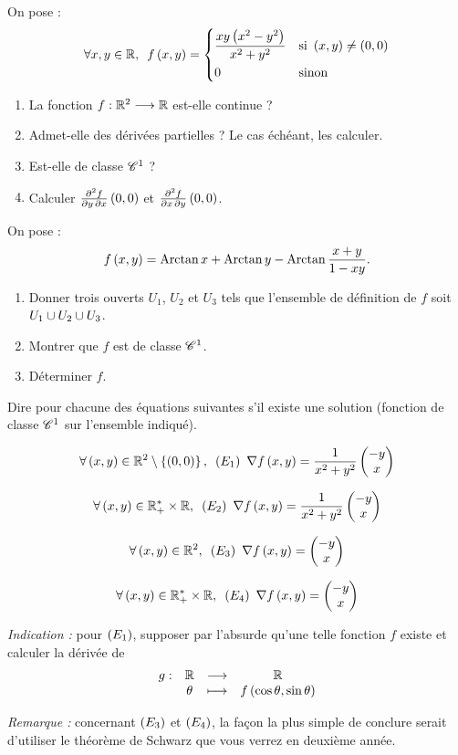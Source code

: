 \begin{exo}
On pose : \[\quantifs{\forall x,y\in\R}f\paren{x,y}=\begin{dcases}
\dfrac{xy\paren{x^2-y^2}}{x^2+y^2} &\text{si }\paren{x,y}\not=\paren{0,0} \\
0 &\text{sinon}
\end{dcases}\]

\begin{enumerate}
    \item La fonction \(f:\mathbb{R}^2\longrightarrow\mathbb{R}\) est-elle continue ? \\
    \item Admet-elle des dérivées partielles ? Le cas échéant, les calculer. \\
    \item Est-elle de classe \(\mathscr{C}^{1}\) ? \\
    \item Calculer \(\pdv{f}{y,x}\left(0,0\right)\) et \(\pdv{f}{x,y}\left(0,0\right)\).
\end{enumerate}
\end{exo}

\begin{exo}[Exercice 5]
On pose : \[f\left(x,y\right)=\operatorname{Arctan} x+\operatorname{Arctan} y-\operatorname{Arctan}\dfrac{x+y}{1-xy}.\]

\begin{enumerate}
    \item Donner trois ouverts  \(U_1\), \(U_2\) et \(U_3\) tels que l'ensemble de définition de \(f\) soit \(U_1\cup U_2\cup U_3\). \\
    \item Montrer que \(f\) est de classe \(\mathscr{C}^{1}\). \\
    \item Déterminer \(f\).
\end{enumerate}
\end{exo}

\begin{exo}[Exercice 6]
Dire pour chacune des équations suivantes s'il existe une solution (fonction de classe \(\mathscr{C}^{1}\) sur l'ensemble indiqué).

\[\quantifs{\forall\paren{x,y}\in\R^2\excluant\accol{\paren{0,0}}}\paren{E_1}~\nabla f\paren{x,y}=\dfrac{1}{x^2+y^2}\dcoords{-y}{x}\]

\[\quantifs{\forall\paren{x,y}\in\Rps\times\R}\paren{E_2}~\nabla f\paren{x,y}=\dfrac{1}{x^2+y^2}\dcoords{-y}{x}\]

\[\quantifs{\forall\paren{x,y}\in\R^2}\paren{E_3}~\nabla f\paren{x,y}=\dcoords{-y}{x}\]

\[\quantifs{\forall\paren{x,y}\in\Rps\times\R}\paren{E_4}~\nabla f\paren{x,y}=\dcoords{-y}{x}\]

\textit{Indication :} pour \(\left(E_1\right)\), supposer par l'absurde qu'une telle fonction \(f\) existe et calculer la dérivée de \[\begin{array}[t]{cccc}g : & \mathbb{R} & \longrightarrow & \mathbb{R} \\ & \theta & \longmapsto & f\left(\cos\theta,\sin\theta\right)\end{array}\]

\textit{Remarque :} concernant \(\left(E_3\right)\) et \(\left(E_4\right)\), la façon la plus simple de conclure serait d'utiliser le théorème de Schwarz que vous verrez en deuxième année.
\end{exo}

